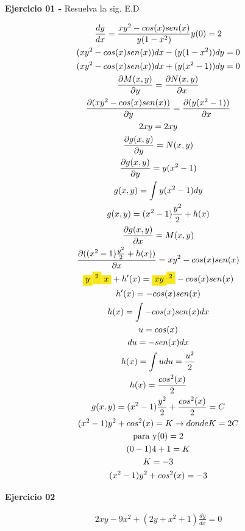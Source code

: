 \documentclass{article}
\begin{document}
\textbf{Ejercicio 01 - }Resuelva la sig. E.D




\begin{gather*}
\frac{dy}{dx} = \frac{xy^{2}-cos(x)sen(x)}{y(1-x^{2})}    y(0)=2 \\
(xy^{2}-cos(x)sen(x))dx -(y(1-x^{2}))dy = 0  \\
(xy^{2}-cos(x)sen(x))dx +(y(x^{2}-1))dy = 0  \\
\frac{\partial M(x,y)}{\partial y} = \frac{\partial N(x,y)}{\partial x} \\
\frac{\partial (xy^{2}-cos(x)sen(x))}{\partial y} = \frac{\partial (y(x^{2}-1))}{\partial x} \\
2xy = 2xy \\
\frac{\partial g(x,y)}{\partial y} = N(x,y) \\
\frac{\partial g(x,y)}{\partial y} = y(x^{2}-1) \\
g(x,y) = \int y(x^{2}-1)dy \\
g(x,y)  =(x^{2}-1)\frac{y^{2}}{2} + h(x) \\
\frac{\partial g(x,y)}{\partial x} = M(x,y) \\
\frac{\partial ((x^{2}-1)\frac{y^{2}}{2} + h(x))}{\partial x} = xy^{2}-cos(x)sen(x) \\
\text{\colorbox[RGB]{248,231,28}{$y$}}\text{\colorbox[RGB]{248,231,28}{$^{2}$}}\text{\colorbox[RGB]{248,231,28}{$x$}} +h'(x) = \text{\colorbox[RGB]{248,231,28}{$xy$}}\text{\colorbox[RGB]{248,231,28}{$^{2}$}}-cos(x)sen(x) \\
h'(x) = -cos(x)sen(x) \\
h(x) = \int -cos(x)sen(x)dx \\
u = cos(x) \\
du = -sen(x)dx \\
h(x) = \int udu = \frac{u^{2}}{2} \\
h(x) =\frac{cos^{2}(x)}{2} \\
g(x,y)  =(x^{2}-1)\frac{y^{2}}{2} + \frac{cos^{2}(x)}{2} = C \\
(x^{2}-1)y^{2}+cos^{2}(x) = K  \rightarrow  donde K = 2C \\
\text{para y}(0)=2 \\
(0-1)4+1=K \\
K = -3 \\
(x^{2}-1)y^{2}+cos^{2}(x) = -3
\end{gather*}


\textbf{Ejercicio 02} 


\begin{gather*}
2xy-9x^{2}+(2y+x^{2}+1)\frac{dy}{dx} = 0
\end{gather*}
\end{document}
